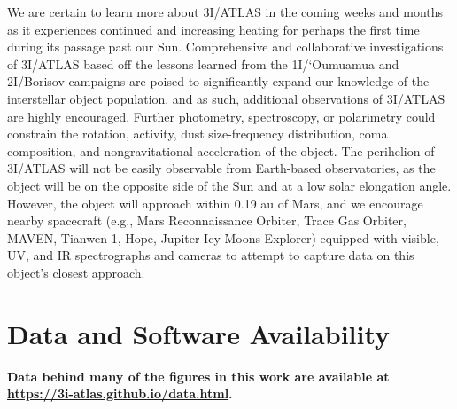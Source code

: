 \documentclass[linenumbers,twocolumn,longbib]{aastex7}
\begin{document}
We are certain to learn more about 3I/ATLAS in the coming weeks and months as it experiences continued and increasing heating for perhaps the first time during its passage past our Sun. Comprehensive and collaborative investigations of 3I/ATLAS based off the lessons learned from the 1I/`Oumuamua and 2I/Borisov campaigns are poised to significantly expand our knowledge of the interstellar object population, and as such, additional observations of 3I/ATLAS are highly encouraged.  Further photometry, spectroscopy, or polarimetry could constrain the rotation, activity, dust size-frequency distribution, coma composition, and nongravitational acceleration of the object. The perihelion of 3I/ATLAS will not be easily observable from Earth-based observatories, as the object will be on the opposite side of the Sun and at a low solar elongation angle. However, the object will approach within 0.19 au of Mars, and we encourage nearby spacecraft (e.g., Mars Reconnaissance Orbiter, Trace Gas Orbiter, MAVEN, Tianwen-1, Hope, Jupiter Icy Moons Explorer) equipped with visible, UV, and IR spectrographs and cameras to attempt to capture data on this object's closest approach.

\section*{Data and Software Availability\label{section:software}}

{\bf Data behind many of the figures in this work are available at \url{https://3i-atlas.github.io/data.html}.}
\end{document}
